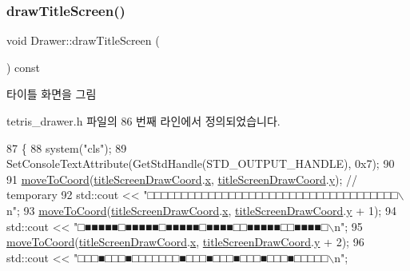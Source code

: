 \subsubsection{\texorpdfstring{draw\+Title\+Screen()}{drawTitleScreen()}}
{\footnotesize\ttfamily void Drawer\+::draw\+Title\+Screen (\begin{DoxyParamCaption}{ }\end{DoxyParamCaption}) const\hspace{0.3cm}{\ttfamily [inline]}}



타이틀 화면을 그림 



tetris\+\_\+drawer.\+h 파일의 86 번째 라인에서 정의되었습니다.


\begin{DoxyCode}
87     \{
88         system(\textcolor{stringliteral}{"cls"});
89         SetConsoleTextAttribute(GetStdHandle(STD\_OUTPUT\_HANDLE), 0x7);
90 
91         \mbox{\hyperlink{class_drawer_ac1a96e007c07cab2e36a7c78484ee9a6}{moveToCoord}}(\mbox{\hyperlink{tetris__drawer_8h_ae68c7ba7cc7e4331abf15313be5319bb}{titleScreenDrawCoord}}.\mbox{\hyperlink{struct_coord_a696eaa744360fc791d0e3b331c549dbe}{x}}, 
      \mbox{\hyperlink{tetris__drawer_8h_ae68c7ba7cc7e4331abf15313be5319bb}{titleScreenDrawCoord}}.\mbox{\hyperlink{struct_coord_a214166cca70cef7dda9201689c3e81ab}{y}}); \textcolor{comment}{// temporary}
92         std::cout << \textcolor{stringliteral}{"□□□□□□□□□□□□□□□□□□□□□□□□□□□□□□□□□□□□□\(\backslash\)n"};
93         \mbox{\hyperlink{class_drawer_ac1a96e007c07cab2e36a7c78484ee9a6}{moveToCoord}}(\mbox{\hyperlink{tetris__drawer_8h_ae68c7ba7cc7e4331abf15313be5319bb}{titleScreenDrawCoord}}.\mbox{\hyperlink{struct_coord_a696eaa744360fc791d0e3b331c549dbe}{x}}, 
      \mbox{\hyperlink{tetris__drawer_8h_ae68c7ba7cc7e4331abf15313be5319bb}{titleScreenDrawCoord}}.\mbox{\hyperlink{struct_coord_a214166cca70cef7dda9201689c3e81ab}{y}} + 1);
94         std::cout << \textcolor{stringliteral}{"□■■■■■□■■■■■□■■■■■□■■■■□□■■■■■□□■■■■□\(\backslash\)n"};
95         \mbox{\hyperlink{class_drawer_ac1a96e007c07cab2e36a7c78484ee9a6}{moveToCoord}}(\mbox{\hyperlink{tetris__drawer_8h_ae68c7ba7cc7e4331abf15313be5319bb}{titleScreenDrawCoord}}.\mbox{\hyperlink{struct_coord_a696eaa744360fc791d0e3b331c549dbe}{x}}, 
      \mbox{\hyperlink{tetris__drawer_8h_ae68c7ba7cc7e4331abf15313be5319bb}{titleScreenDrawCoord}}.\mbox{\hyperlink{struct_coord_a214166cca70cef7dda9201689c3e81ab}{y}} + 2);
96         std::cout << \textcolor{stringliteral}{"□□□■□□□■□□□□□□□■□□□■□□□■□□□■□□□■□□□□□\(\backslash\)n"};

\end{DoxyCode}
